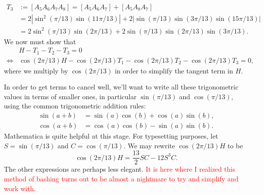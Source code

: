 \begin{solution}{5}
    \begin{align*}
        T_3 &:= [A_5 A_6 A_7 A_8] = [A_5 A_6 A_7] + [A_5 A_8 A_7] \\
        &= 2 | \sin^2{\left( \pi / 13 \right)} \sin{\left( 11 \pi / 13 \right)} | + 2 | \sin{\left( \pi / 13 \right)} \sin{\left( 3 \pi / 13 \right)} \sin{\left( 15 \pi / 13 \right)} | \\
        &= 2 \sin^2{\left( \pi / 13 \right)} \sin{\left( 2 \pi / 13 \right)} + 2 \sin{\left( \pi / 13 \right)} \sin{\left( 2 \pi / 13 \right)} \sin{\left( 3 \pi / 13 \right)}
    .\end{align*}
    We now must show that
    \begin{align*}
        &H - T_1 - T_2 - T_3 = 0 \\
        \iff &\cos{\left( 2 \pi / 13 \right)} H - \cos{\left( 2 \pi / 13 \right)} T_1 - \cos{\left( 2 \pi / 13 \right)} T_2 - \cos{\left( 2 \pi / 13 \right)} T_3 = 0
    ,\end{align*}
    where we multiply by \( \cos{\left( 2 \pi / 13 \right)} \) in order to simplify the tangent term in \( H \).

    In order to get terms to cancel well, we'll want to write all these trigonometric values in terms of smaller ones, in particular \( \sin{\left( \pi / 13 \right)} \) and \( \cos{\left( \pi / 13 \right)} \), using the common trigonometric addition rules:
    \begin{align*}
        \sin{\left( a + b \right)} &= \sin{\left( a \right)} \cos{\left( b \right)} + \cos{\left( a \right)} \sin{\left( b \right)}, \\
        \cos{\left( a + b \right)} &= \cos{\left( a \right)} \cos{\left( b \right)} - \sin{\left( a \right)} \sin{\left( b \right)}
    .\end{align*}
    Mathematica is quite helpful at this stage. For typesetting purposes, let \( S = \sin{\left( \pi / 13 \right)} \) and \( C = \cos{\left( \pi / 13 \right)} \). We may rewrite \( \cos{\left( 2 \pi / 13 \right)} H \) to be
    \[
        \cos{\left( 2 \pi / 13 \right)} H = \frac{13}{2} S C - 12 S^3 C
    .\]
    The other expressions are perhaps less elegant. \textcolor{red}{It is here
    where I realized this method of bashing turns out to be almost a nightmare
to try and simplify and work with.}
\end{solution}
